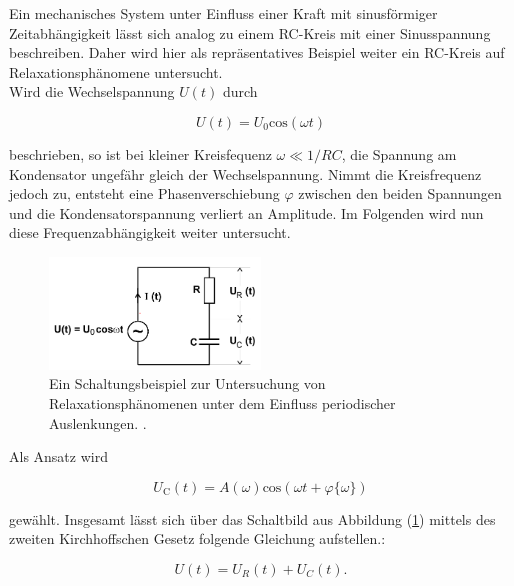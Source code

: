         \noindent Ein mechanisches System unter Einfluss einer Kraft mit sinusförmiger Zeitabhängigkeit lässt sich analog zu einem RC-Kreis mit 
        einer Sinusspannung beschreiben. Daher wird hier als repräsentatives Beispiel weiter ein RC-Kreis auf Relaxationsphänomene untersucht.\\
        Wird die Wechselspannung $U(t)$ durch

        \begin{equation*}
            U(t) = U_0 \text{cos}( \omega t)
        \end{equation*}

        \noindent beschrieben, so ist bei kleiner Kreisfequenz $\omega \ll 1/RC$, die Spannung am Kondensator ungefähr gleich der Wechselspannung.
        Nimmt die Kreisfrequenz jedoch zu, entsteht eine Phasenverschiebung $\varphi$ zwischen den beiden Spannungen und die 
        Kondensatorspannung verliert an Amplitude. Im Folgenden wird nun diese Frequenzabhängigkeit weiter untersucht.

        \begin{figure}
            \centering
            \includegraphics[width=0.5\textwidth]{latex/images/periodische_Auslenkung.PNG}
            \caption{Ein Schaltungsbeispiel zur Untersuchung von Relaxationsphänomenen unter dem Einfluss periodischer Auslenkungen.
            \protect \cite{V353}.}
            \label{img:per_Aus}
        \end{figure}

        \noindent Als Ansatz wird

        \begin{equation}
            U_{\text{C}}(t) = A(\omega) \text{cos}(\omega t + \varphi \{ \omega \} )
            \label{eqn:7}
        \end{equation}

        \noindent gewählt. Insgesamt lässt sich über das Schaltbild aus Abbildung (\ref{img:per_Aus}) mittels des zweiten Kirchhoffschen Gesetz
        folgende Gleichung aufstellen.:

        \begin{equation}
            U(t) = U_R(t) + U_C(t) .
            \label{eqn:7a}
        \end{equation}

